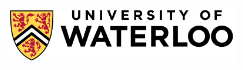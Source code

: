 \begin{titlepage}
    \begin{addmargin}[-1cm]{-3cm}
        \begin{center}
            \large

            \hfill

            \vfill

            \begingroup
            \color{CTtitle}\spacedallcaps{\myTitle} \\ \bigskip
            \endgroup

            \spacedlowsmallcaps{\myName}

            \vfill

            \includegraphics[width=6cm]{img/uwlogo} \\ \medskip

            \myDegree \\
            \myDepartment \\
            \myUni \\ \bigskip

            \myTime

            \vfill

        \end{center}
    \end{addmargin}
\end{titlepage}
